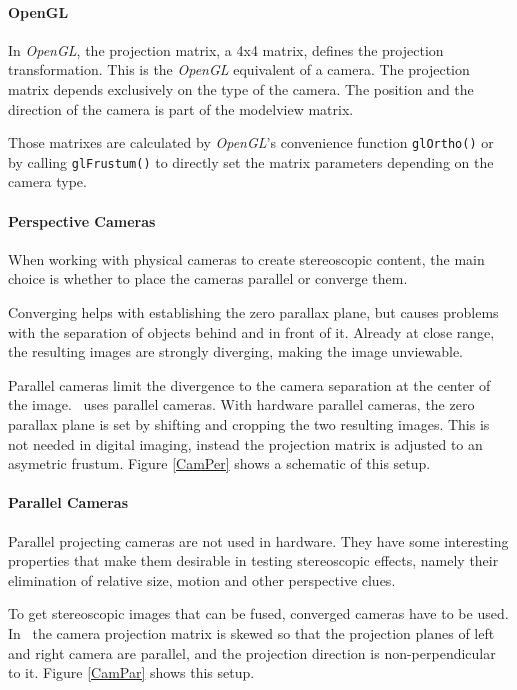 \paragraph{OpenGL}
In \textit{OpenGL}, the projection matrix, a 4x4 matrix, defines the projection transformation.
This is the \textit{OpenGL} equivalent of a camera.
The projection matrix depends exclusively on the type of the camera.
The position and the direction of the camera is part of the modelview matrix.

Those matrixes are calculated by \textit{OpenGL}'s convenience function \lstinline{glOrtho()} or by calling \lstinline{glFrustum()} to directly set the matrix parameters depending on the camera type.


\paragraph{Perspective Cameras}
When working with physical cameras to create stereoscopic content, the main choice is whether to place the cameras parallel or converge them.

Converging helps with establishing the zero parallax plane, but causes problems with the separation of objects behind and in front of it.
Already at close range, the resulting images are strongly diverging, making the image unviewable.

Parallel cameras limit the divergence to the camera separation at the center of the image.
\ER\ uses parallel cameras.
With hardware parallel cameras, the zero parallax plane is set by shifting and cropping the two resulting images.
This is not needed in digital imaging, instead the projection matrix is adjusted to an asymetric frustum.
Figure \ref{CamPer} shows a schematic of this setup.

\paragraph{Parallel Cameras}
Parallel projecting cameras are not used in hardware.
They have some interesting properties that make them desirable in testing stereoscopic effects,
namely their elimination of relative size, motion and other perspective clues.

To get stereoscopic images that can be fused, converged cameras have to be used.
In \ER\ the camera projection matrix is skewed so that the projection planes of left and right camera are parallel, and the projection direction is non-perpendicular to it.
Figure \ref{CamPar} shows this setup.


